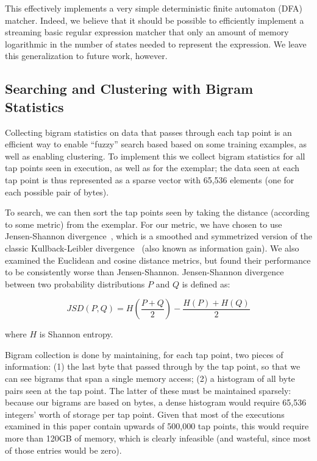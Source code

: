 This effectively implements a very simple deterministic finite automaton
(DFA) matcher. Indeed, we believe that it should be possible to
efficiently implement a streaming basic regular expression matcher that
only an amount of memory logarithmic in the number of states needed to
represent the expression. We leave this generalization to future work,
however.

\subsection{Searching and Clustering with Bigram Statistics}
\label{sec:implementation:subsec:bigram}

Collecting bigram statistics on data that passes through each tap point
is an efficient way to enable ``fuzzy'' search based based on some
training examples, as well as enabling clustering. To implement this
we collect bigram statistics for all tap points seen in execution, as
well as for the exemplar; the data seen at each tap point is thus
represented as a sparse vector with 65,536 elements (one for each
possible pair of bytes).

To search, we can then sort the tap points seen by taking the distance
(according to some metric) from the exemplar. For our metric, we have
chosen to use Jensen-Shannon divergence~\cite{Lin:2006fk}, which is a
smoothed and symmetrized version of the classic Kullback-Leibler
divergence~\cite{Kullback:1951uq} (also known as information gain). We
also examined the Euclidean and cosine distance metrics, but found their
performance to be consistently worse than Jensen-Shannon. Jensen-Shannon
divergence between two probability distributions $P$ and $Q$ is defined
as:

\[
JSD(P, Q) = H \left ( \frac{P+Q}{2} \right ) - \frac{H(P)+H(Q)}{2}
\]

\noindent where $H$ is Shannon entropy.

Bigram collection is done by maintaining, for each tap point, two pieces
of information: (1) the last byte that passed through by the tap point,
so that we can see bigrams that span a single memory access; (2) a
histogram of all byte pairs seen at the tap point. The latter of these
must be maintained sparsely: because our bigrams are based on bytes, a
dense histogram would require 65,536 integers' worth of storage per tap
point. Given that most of the executions examined in this paper contain
upwards of 500,000 tap points, this would require more than 120GB of
memory, which is clearly infeasible (and wasteful, since most of those
entries would be zero).

